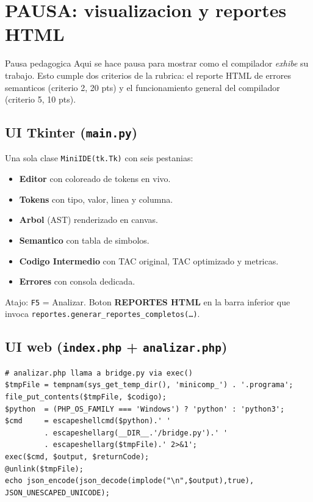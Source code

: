 \documentclass[11pt,a4paper]{article}
\begin{document}
\section{PAUSA: visualizacion y reportes HTML}

\begin{pausa}{Pausa pedagogica}
Aqui se hace pausa para mostrar como el compilador \emph{exhibe} su
trabajo. Esto cumple dos criterios de la rubrica: el reporte HTML
de errores semanticos (criterio 2, 20 pts) y el funcionamiento general
del compilador (criterio 5, 10 pts).
\end{pausa}

\subsection{UI Tkinter (\texttt{main.py})}

Una sola clase \texttt{MiniIDE(tk.Tk)} con seis pestanias:
\begin{itemize}[leftmargin=*,nosep]
  \item \textbf{Editor} con coloreado de tokens en vivo.
  \item \textbf{Tokens} con tipo, valor, linea y columna.
  \item \textbf{Arbol} (AST) renderizado en canvas.
  \item \textbf{Semantico} con tabla de simbolos.
  \item \textbf{Codigo Intermedio} con TAC original, TAC optimizado y metricas.
  \item \textbf{Errores} con consola dedicada.
\end{itemize}

Atajo: \texttt{F5} = Analizar. Boton \textbf{REPORTES HTML} en la barra
inferior que invoca \texttt{reportes.generar\_reportes\_completos(\dots)}.

\subsection{UI web (\texttt{index.php} + \texttt{analizar.php})}

\begin{lstlisting}[style=py]
# analizar.php llama a bridge.py via exec()
$tmpFile = tempnam(sys_get_temp_dir(), 'minicomp_') . '.programa';
file_put_contents($tmpFile, $codigo);
$python  = (PHP_OS_FAMILY === 'Windows') ? 'python' : 'python3';
$cmd     = escapeshellcmd($python).' '
         . escapeshellarg(__DIR__.'/bridge.py').' '
         . escapeshellarg($tmpFile).' 2>&1';
exec($cmd, $output, $returnCode);
@unlink($tmpFile);
echo json_encode(json_decode(implode("\n",$output),true), JSON_UNESCAPED_UNICODE);
\end{lstlisting}
\end{document}
